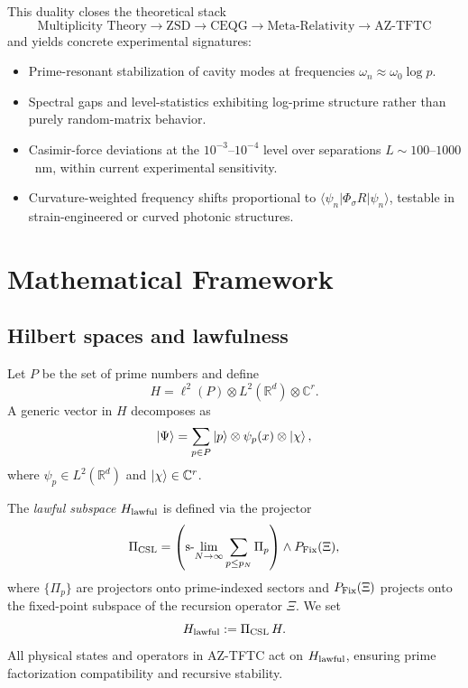 \documentclass[11pt]{article}
\begin{document}
This duality closes the theoretical stack
\[
\text{Multiplicity Theory} \to \text{ZSD} \to \text{CEQG} \to \text{Meta-Relativity} \to \text{AZ-TFTC}
\]
and yields concrete experimental signatures:
\begin{itemize}
  \item Prime-resonant stabilization of cavity modes at frequencies $\omega_n \approx \omega_0 \log p$.
  \item Spectral gaps and level-statistics exhibiting log-prime structure rather than purely random-matrix behavior.
  \item Casimir-force deviations at the $10^{-3}$--$10^{-4}$ level over separations $L \sim 100$--$1000$~nm, within current experimental sensitivity.\cite{CasimirReview,AdvancesCasimir}
  \item Curvature-weighted frequency shifts proportional to $\langle \psi_n|\Phi_\sigma R|\psi_n\rangle$, testable in strain-engineered or curved photonic structures.
\end{itemize}

\section{Mathematical Framework}

\subsection{Hilbert spaces and lawfulness}

Let $P$ be the set of prime numbers and define
\begin{equation}
H = \ell^2(P)\otimes L^2(\mathbb{R}^d)\otimes \mathbb{C}^r.
\end{equation}
A generic vector in $H$ decomposes as
\begin{equation}
\ket{\Psi} = \sum_{p\in P}\ket{p}\otimes \psi_p(x) \otimes \ket{\chi},
\end{equation}
where $\psi_p\in L^2(\mathbb{R}^d)$ and $\ket{\chi}\in\mathbb{C}^r$.

The \emph{lawful subspace} $H_{\rm lawful}$ is defined via the projector
\begin{equation}
\Pi_{\rm CSL}
  = \left(\text{s-}\!\lim_{N\to\infty}\sum_{p\le p_N}\Pi_p\right)\wedge P_{\rm Fix}(\Xi),
\end{equation}
where $\{\Pi_p\}$ are projectors onto prime-indexed sectors and $P_{\rm Fix}(\Xi)$ projects onto the fixed-point subspace of the recursion operator $\Xi$.\cite{MetaRel}
We set
\begin{equation}
H_{\rm lawful} := \Pi_{\rm CSL}\,H.
\end{equation}
All physical states and operators in AZ-TFTC act on $H_{\rm lawful}$, ensuring prime factorization compatibility and recursive stability.
\end{document}
